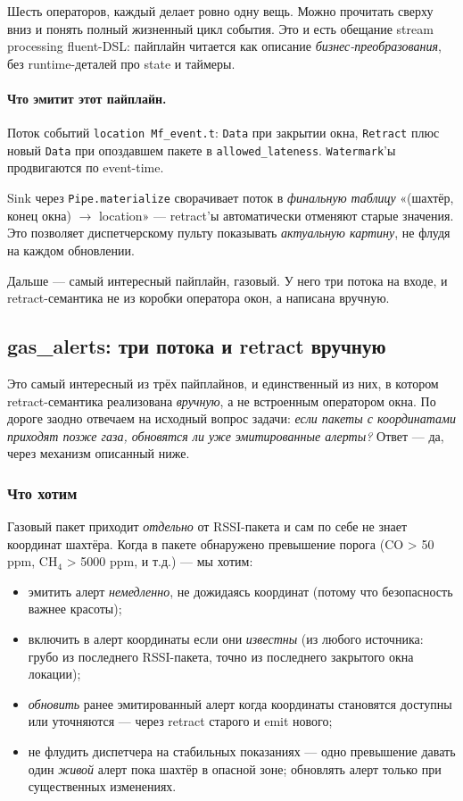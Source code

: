 Шесть операторов, каждый делает ровно одну вещь. Можно прочитать
сверху вниз и понять полный жизненный цикл события. Это и есть
обещание stream processing fluent-DSL: пайплайн читается как описание
\emph{бизнес-преобразования}, без runtime-деталей про state и
таймеры.

\paragraph{Что эмитит этот пайплайн.} Поток событий
\texttt{location Mf\_event.t}: \texttt{Data} при закрытии окна,
\texttt{Retract} плюс новый \texttt{Data} при опоздавшем пакете в
\texttt{allowed\_lateness}. \texttt{Watermark}'ы продвигаются по
event-time.

Sink через \texttt{Pipe.materialize} сворачивает поток в \emph{финальную
таблицу} «(шахтёр, конец окна) $\to$ location» --- retract'ы
автоматически отменяют старые значения. Это позволяет диспетчерскому
пульту показывать \emph{актуальную картину}, не флудя на каждом
обновлении.

Дальше --- самый интересный пайплайн, газовый. У него три потока на
входе, и retract-семантика не из коробки оператора окон, а написана
вручную.

\subsection{gas\_alerts: три потока и retract вручную}\label{ssec:gas}

Это самый интересный из трёх пайплайнов, и единственный из них,
в котором retract-семантика реализована \emph{вручную}, а не
встроенным оператором окна. По дороге заодно отвечаем на исходный
вопрос задачи: \emph{если пакеты с координатами приходят позже газа,
обновятся ли уже эмитированные алерты?} Ответ --- да, через
механизм описанный ниже.

\subsubsection{Что хотим}

Газовый пакет приходит \emph{отдельно} от RSSI-пакета и сам по себе
не знает координат шахтёра. Когда в пакете обнаружено превышение
порога (CO > 50 ppm, CH$_4$ > 5000 ppm, и т.д.) --- мы хотим:

\begin{itemize}
\item эмитить алерт \emph{немедленно}, не дожидаясь координат
(потому что безопасность важнее красоты);
\item включить в алерт координаты если они \emph{известны} (из
любого источника: грубо из последнего RSSI-пакета, точно из
последнего закрытого окна локации);
\item \emph{обновить} ранее эмитированный алерт когда координаты
становятся доступны или уточняются --- через retract старого и emit
нового;
\item не флудить диспетчера на стабильных показаниях ---
одно превышение давать один \emph{живой} алерт пока шахтёр в опасной
зоне; обновлять алерт только при существенных изменениях.
\end{itemize}

